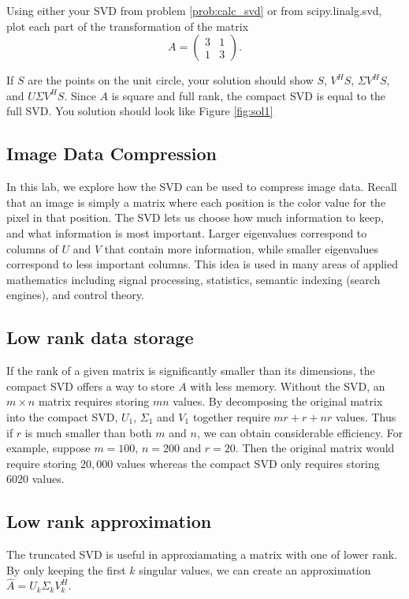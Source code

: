 \begin{problem}
Using either your SVD from problem \ref{prob:calc_svd} or from scipy.linalg.svd, plot each part of the transformation of the matrix
\begin{equation}
A =  \begin{pmatrix}3 & 1\\1 & 3\end{pmatrix}.
\end{equation}

If $S$ are the points on the unit circle, your solution should show $S$, $V^HS$, $\Sigma V^HS$, and $ U\Sigma V^HS$.
Since $A$ is square and full rank, the compact SVD is equal to the full SVD.
You solution should look like Figure \ref{fig:sol1}
\end{problem}




\subsection*{Image Data Compression}

In this lab, we explore how the SVD can be used to compress image data.
Recall that an image is simply a matrix where each position is the color value for the pixel in that position.
The SVD lets us choose how much information to keep, and what information is most important.
Larger eigenvalues correspond to columns of $U$ and $V$ that contain more information, while smaller eigenvalues correspond to less important columns.
This idea is used in many areas of applied mathematics including signal processing, statistics, semantic indexing (search engines), and control theory.


\subsection*{Low rank data storage}
If the rank of a given matrix is significantly smaller than its dimensions, the compact SVD offers a way to store $A$ with less memory.
Without the SVD, an $m\times n$ matrix requires storing $mn$ values.
By decomposing the original matrix into the compact SVD, $U_1$, $\Sigma_1$ and $V_1$ together require $mr+r+nr$ values.
Thus if $r$ is much smaller than both $m$ and $n$, we can obtain considerable efficiency.
For example, suppose $m=100$, $n=200$ and $r=20$.
Then the original matrix would require storing $20,000$ values whereas the compact SVD only requires storing $6020$ values.

\subsection*{Low rank approximation}
The truncated SVD is useful in approxiamating a matrix with one of lower rank.
By only keeping the first $k$ singular values, we can create an approximation $\widehat A = U_k\Sigma_k V_k^H$.

